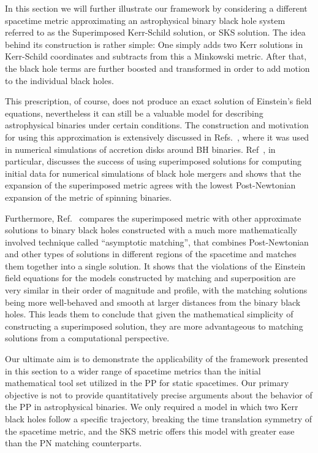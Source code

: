 In this section we will further illustrate our framework by considering a different spacetime metric approximating an astrophysical binary black hole system referred to as the Superimposed Kerr-Schild solution, or \ac{SKS} solution. The idea behind its construction is rather simple: One simply adds two Kerr solutions in Kerr-Schild coordinates and subtracts from this a Minkowski metric. After that, the black hole terms are further boosted and transformed in order to add motion to the individual black holes.

This prescription, of course, does not produce an exact solution of Einstein's field equations, nevertheless it can still be a valuable model for describing astrophysical binaries under certain conditions. The construction and motivation for using this approximation is extensively discussed in Refs.~\cite{Armengol:2021shd, PhysRevD.104.044041}, where it was  used in numerical simulations of accretion disks around \ac{BH} binaries. Ref~\cite{Armengol:2021shd}, in particular, discusses the success of using superimposed solutions for computing initial data for numerical simulations of black hole mergers and shows that the expansion of the superimposed metric agrees with the lowest Post-Newtonian expansion of the metric of spinning binaries.

Furthermore, Ref.~\cite{PhysRevD.104.044041} compares the superimposed metric with other approximate solutions to binary black holes constructed with a much more mathematically involved technique called ``asymptotic matching'', that combines Post-Newtonian and other types of solutions in different regions of the spacetime and matches them together into a single solution. It shows that the violations of the Einstein field equations for the models constructed by matching and superposition are very similar in their order of magnitude and profile, with the matching solutions being more well-behaved and smooth at larger distances from the binary black holes. This leads them to conclude that given the mathematical simplicity of constructing a superimposed solution, they are more advantageous to matching solutions from a computational perspective.

Our ultimate aim is to demonstrate the applicability of the framework presented in this section to a wider range of spacetime metrics than the initial mathematical tool set utilized in the \ac{PP} for static spacetimes. Our primary objective is not to provide quantitatively precise arguments about the behavior of the \ac{PP} in astrophysical binaries. We only required a model in which two Kerr black holes follow a specific trajectory, breaking the time translation symmetry of the spacetime metric, and the \ac{SKS} metric offers this model with greater ease than the PN matching counterparts.

